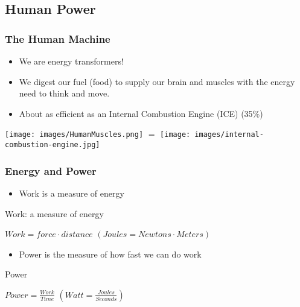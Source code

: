 \documentclass[]{beamer}
\begin{document}
\subsection{Human Power}
%
\frame
{
    \frametitle{The Human Machine}
    \begin{itemize}
        \item<1-> We are energy transformers!
        \item<2-> We digest our fuel (food) to supply our brain and muscles
            with the energy need to think and move.
        \item<3-> About as efficient as an Internal Combustion Engine (ICE) (35\%)
    \end{itemize}
    \begin{center}
        \texttt{[image: images/HumanMuscles.png]}
        \Large{$=$}
        \texttt{[image: images/internal-combustion-engine.jpg]}
    \end{center}
}
%
\frame
{
    \frametitle{Energy and Power}
    \begin{itemize}
        \item<1-> Work is a measure of energy
    \end{itemize}
	\begin{beamerboxesrounded}[upper=uppercol,lower=lowercol,shadow=true]{Work:
        a measure of energy}
		\begin{center}
            $Work = force \cdot distance$ $(Joules=Newtons\cdot Meters)$ 
		\end{center}
	\end{beamerboxesrounded}
    \begin{itemize}
        \item<2-> Power is the measure of how fast we can do work
    \end{itemize}
	\begin{beamerboxesrounded}[upper=uppercol,lower=lowercol,shadow=true]{Power}
		\begin{center}
            $Power=\frac{Work}{Time}$ $(Watt = \frac{Joules}{Seconds})$
        \end{center}
	\end{beamerboxesrounded}
}
\end{document}
